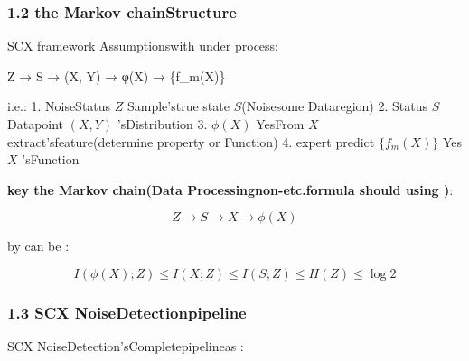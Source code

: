 \documentclass[
  12pt,
]{article}
\newenvironment{Shaded}{}{}
\newcommand{\NormalTok}[1]{#1}
\begin{document}
\subsubsection{1.2
the Markov chainStructure}\label{ux9a6cux5c14ux53efux592bux94feux7ed3ux6784}

SCX framework Assumptionswith under process: 

\begin{Shaded}
\begin{Highlighting}[]
\NormalTok{Z  →  S  →  (X, Y)  →  φ(X)}
\NormalTok{                      →  \{f\_m(X)\}}
\end{Highlighting}
\end{Shaded}

i.e.:  1. NoiseStatus \(Z\) Sample'strue state
\(S\)(Noisesome Dataregion) 2. Status \(S\) Datapoint  \((X, Y)\)
'sDistribution 3. \(\phi(X)\) YesFrom \(X\) extract'sfeature(determine property or Function) 4.
expert predict \(\{f_m(X)\}\) Yes \(X\) 'sFunction

\textbf{key the Markov chain(Data Processingnon-etc.formula should using )}: 

\[Z \to S \to X \to \phi(X)\]

by can be : 

\[I(\phi(X); Z) \leq I(X; Z) \leq I(S; Z) \leq H(Z) \leq \log 2\]

\subsubsection{1.3 SCX
NoiseDetectionpipeline}\label{scx-ux566aux58f0ux68c0ux6d4bux6d41ux7a0b}

SCX NoiseDetection'sCompletepipelineas : 
\end{document}
